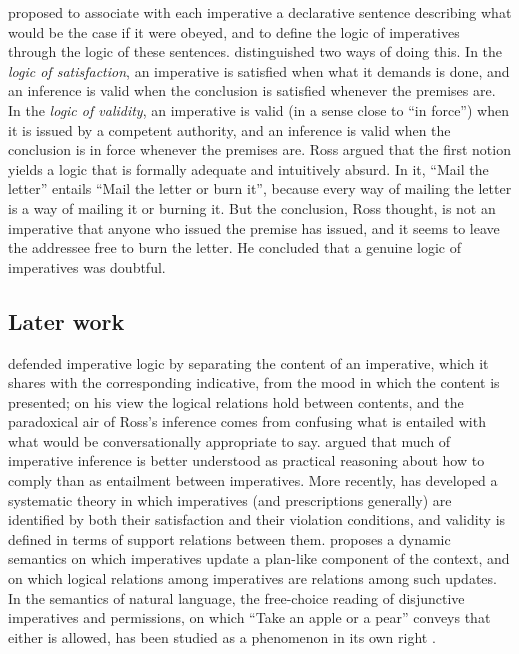 \documentclass{situationist-preprint}
\begin{document}
\citet{HofstadterMcKinsey1939} proposed to associate with each imperative a declarative sentence describing what would be the case if it were obeyed, and to define the logic of imperatives through the logic of these sentences. \citet{Ross1941} distinguished two ways of doing this. In the \emph{logic of satisfaction}, an imperative is satisfied when what it demands is done, and an inference is valid when the conclusion is satisfied whenever the premises are. In the \emph{logic of validity}, an imperative is valid (in a sense close to \enquote{in force}) when it is issued by a competent authority, and an inference is valid when the conclusion is in force whenever the premises are. Ross argued that the first notion yields a logic that is formally adequate and intuitively absurd. In it, \enquote{Mail the letter} entails \enquote{Mail the letter or burn it}, because every way of mailing the letter is a way of mailing it or burning it. But the conclusion, Ross thought, is not an imperative that anyone who issued the premise has issued, and it seems to leave the addressee free to burn the letter. He concluded that a genuine logic of imperatives was doubtful.

\subsection{Later work}

\citet{Hare1949,Hare1967} defended imperative logic by separating the content of an imperative, which it shares with the corresponding indicative, from the mood in which the content is presented; on his view the logical relations hold between contents, and the paradoxical air of Ross's inference comes from confusing what is entailed with what would be conversationally appropriate to say. \citet{Williams1963} argued that much of imperative inference is better understood as practical reasoning about how to comply than as entailment between imperatives. More recently, \citet{Vranas2008,Vranas2011} has developed a systematic theory in which imperatives (and prescriptions generally) are identified by both their satisfaction and their violation conditions, and validity is defined in terms of support relations between them. \citet{Charlow2014} proposes a dynamic semantics on which imperatives update a plan-like component of the context, and on which logical relations among imperatives are relations among such updates. In the semantics of natural language, the free-choice reading of disjunctive imperatives and permissions, on which \enquote{Take an apple or a pear} conveys that either is allowed, has been studied as a phenomenon in its own right \citep{Kamp1973,Fox2007}.
\end{document}
